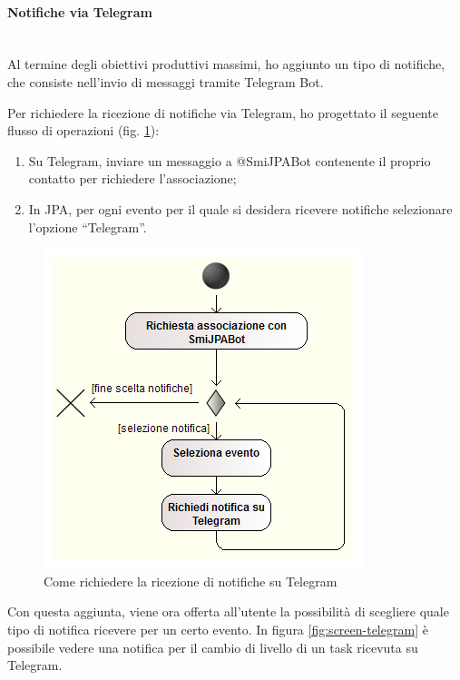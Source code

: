 \paragraph{Notifiche via Telegram} \mbox{} \\

Al termine degli obiettivi produttivi massimi, ho aggiunto un tipo di
notifiche, che consiste nell'invio di messaggi tramite Telegram Bot.

Per richiedere la ricezione di notifiche via Telegram, ho progettato il
seguente flusso di operazioni (fig. \ref{fig:telegram-request}):

\begin{enumerate}
\item Su Telegram, inviare un messaggio a @SmiJPABot contenente il proprio
  contatto per richiedere l'associazione;
\item In JPA, per ogni evento per il quale si desidera ricevere notifiche
  selezionare l'opzione ``Telegram''.
\end{enumerate}

\begin{figure}[H]%
\centering
\includegraphics[width=.8\columnwidth]{immagini/telegram-notif-wf}
\caption{Come richiedere la ricezione di notifiche su Telegram}
\label{fig:telegram-request}%
\end{figure}

Con questa aggiunta, viene ora offerta all'utente la possibilità di scegliere
quale tipo di notifica ricevere per un certo evento. In figura
\ref{fig:screen-telegram} è possibile vedere una notifica per il cambio di
livello di un task ricevuta su Telegram.

